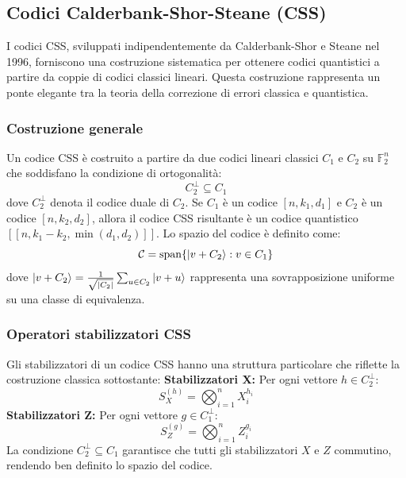 \documentclass[a4paper,12pt]{report}
\theoremstyle{plain}
\begin{document}
\subsection{Codici Calderbank-Shor-Steane (CSS)}
I codici CSS, sviluppati indipendentemente da Calderbank-Shor e Steane nel 1996, forniscono una costruzione sistematica per ottenere codici quantistici a partire da coppie di codici classici lineari. Questa costruzione rappresenta un ponte elegante tra la teoria della correzione di errori classica e quantistica.
\subsubsection{Costruzione generale}
Un codice CSS è costruito a partire da due codici lineari classici $C_1$ e $C_2$ su $\mathbb{F}_2^n$ che soddisfano la condizione di ortogonalità:
\[
C_2^{\perp} \subseteq C_1
\]
dove $C_2^{\perp}$ denota il codice duale di $C_2$. Se $C_1$ è un codice $[n, k_1, d_1]$ e $C_2$ è un codice $[n, k_2, d_2]$, allora il codice CSS risultante è un codice quantistico $[[n, k_1 - k_2, \min(d_1, d_2)]]$.
Lo spazio del codice è definito come:
\[
\mathcal{C} = \text{span}\{\ket{v + C_2} : v \in C_1\}
\]
dove $\ket{v + C_2} = \frac{1}{\sqrt{|C_2|}} \sum_{u \in C_2} \ket{v + u}$ rappresenta una sovrapposizione uniforme su una classe di equivalenza.
\subsubsection{Operatori stabilizzatori CSS}
Gli stabilizzatori di un codice CSS hanno una struttura particolare che riflette la costruzione classica sottostante:
\textbf{Stabilizzatori X:} Per ogni vettore $h \in C_2^{\perp}$:
\[
S_X^{(h)} = \bigotimes_{i=1}^n X_i^{h_i}
\]
\textbf{Stabilizzatori Z:} Per ogni vettore $g \in C_1^{\perp}$:
\[
S_Z^{(g)} = \bigotimes_{i=1}^n Z_i^{g_i}
\]
La condizione $C_2^{\perp} \subseteq C_1$ garantisce che tutti gli stabilizzatori $X$ e $Z$ commutino, rendendo ben definito lo spazio del codice.
\end{document}
